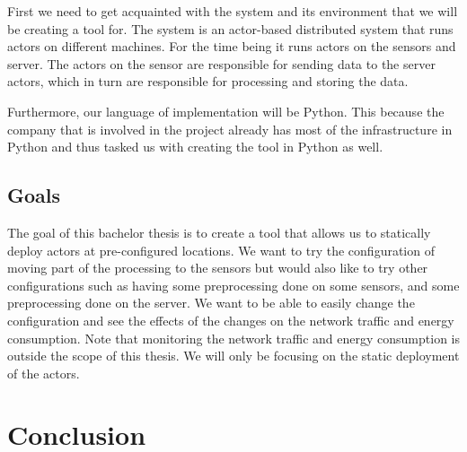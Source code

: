 \documentclass[a4paper]{article}
\begin{document}
First we need to get acquainted with the system and its environment that we will be creating a tool for. The system is an actor-based distributed system that runs actors on different machines. For the time being it runs actors on the sensors and server. The actors on the sensor are responsible for sending data to the server actors, which in turn are responsible for processing and storing the data.

Furthermore, our language of implementation will be Python. This because the company that is involved in the project already has most of the infrastructure in Python and thus tasked us with creating the tool in Python as well.

\subsection{Goals}
The goal of this bachelor thesis is to create a tool that allows us to statically deploy actors at pre-configured locations. We want to try the configuration of moving part of the processing to the sensors but would also like to try other configurations such as having some preprocessing done on some sensors, and some preprocessing done on the server. We want to be able to easily change the configuration and see the effects of the changes on the network traffic and energy consumption. Note that monitoring the network traffic and energy consumption is outside the scope of this thesis. We will only be focusing on the static deployment of the actors.

\section{Conclusion}

\printbibliography
\end{document}
